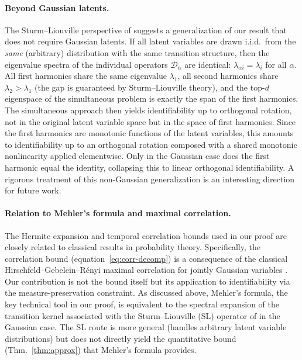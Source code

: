 \paragraph{Beyond Gaussian latents.}
The Sturm--Liouville perspective of \citet{sprekeler2014} suggests a generalization of our result that does not require Gaussian latents.
If all latent variables are drawn i.i.d.\ from the \emph{same} (arbitrary) distribution with the same transition structure, then the eigenvalue spectra of the individual operators $\mathcal{D}_\alpha$ are identical: $\lambda_{\alpha i} = \lambda_i$ for all $\alpha$.
All first harmonics share the same eigenvalue $\lambda_1$, all second harmonics share $\lambda_2 > \lambda_1$ (the gap is guaranteed by Sturm--Liouville theory), and the top-$d$ eigenspace of the simultaneous problem is exactly the span of the first harmonics.
The simultaneous approach then yields identifiability up to orthogonal rotation, not in the original latent variable space but in the space of first harmonics.
Since the first harmonics are monotonic functions of the latent variables, this amounts to identifiability up to an orthogonal rotation composed with a shared monotonic nonlinearity applied elementwise.
Only in the Gaussian case does the first harmonic equal the identity, collapsing this to linear orthogonal identifiability.
A rigorous treatment of this non-Gaussian generalization is an interesting direction for future work.

\paragraph{Relation to Mehler's formula and maximal correlation.}
The Hermite expansion and temporal correlation bounds used in our proof are closely related to classical results in probability theory.
Specifically, the correlation bound (equation~\eqref{eq:corr-decomp}) is a consequence of the classical Hirschfeld--Gebelein--R\'enyi maximal correlation for jointly Gaussian variables \citep{gebelein1941, renyi1959, lancaster1958}.
Our contribution is not the bound itself but its application to identifiability via the measure-preservation constraint.
As discussed above, Mehler's formula, the key technical tool in our proof, is equivalent to the spectral expansion of the transition kernel associated with the Sturm--Liouville (SL) operator of \citet{sprekeler2014} in the Gaussian case.
The SL route is more general (handles arbitrary latent variable distributions) but does not directly yield the quantitative bound (Thm.~\ref{thm:approx}) that Mehler's formula provides.

